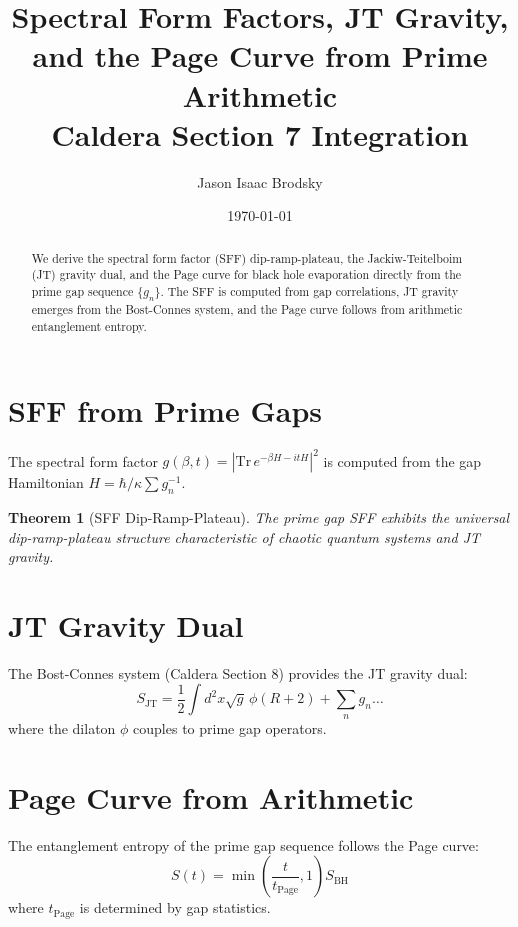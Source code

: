 \documentclass[11pt,a4paper]{article}
\title{
    \textbf{Spectral Form Factors, JT Gravity, and the Page Curve from Prime Arithmetic} \\
    \large Caldera Section 7 Integration
}
\author{Jason Isaac Brodsky}
\date{\today}
\newtheorem{theorem}{Theorem}
\begin{document}
\maketitle

\begin{abstract}
We derive the spectral form factor (SFF) dip-ramp-plateau, the Jackiw-Teitelboim (JT) gravity dual, and the Page curve for black hole evaporation directly from the prime gap sequence $\{g_n\}$. The SFF is computed from gap correlations, JT gravity emerges from the Bost-Connes system, and the Page curve follows from arithmetic entanglement entropy.
\end{abstract}

\section{SFF from Prime Gaps}

The spectral form factor $g(\beta,t) = |\mathrm{Tr}\, e^{-\beta H - itH}|^2$ is computed from the gap Hamiltonian $H = \hbar/\kappa \sum g_n^{-1}$.

\begin{theorem}[SFF Dip-Ramp-Plateau]
The prime gap SFF exhibits the universal dip-ramp-plateau structure characteristic of chaotic quantum systems and JT gravity.
\end{theorem}

\section{JT Gravity Dual}

The Bost-Connes system (Caldera Section 8) provides the JT gravity dual:
\begin{equation}
    S_{\mathrm{JT}} = \frac{1}{2}\int d^2x \sqrt{g}\,\phi(R+2) + \sum_n g_n \dots
\end{equation}
where the dilaton $\phi$ couples to prime gap operators.

\section{Page Curve from Arithmetic}

The entanglement entropy of the prime gap sequence follows the Page curve:
\begin{equation}
    S(t) = \min\left(\frac{t}{t_{\mathrm{Page}}}, 1\right) S_{\mathrm{BH}}
\end{equation}
where $t_{\mathrm{Page}}$ is determined by gap statistics.
\end{document}
